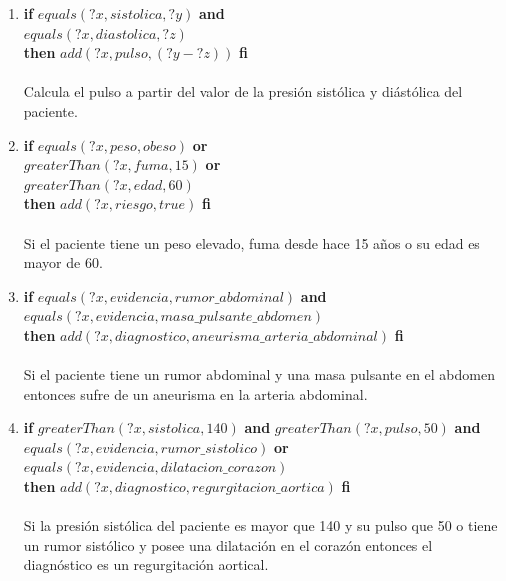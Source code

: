 \documentclass[10pt, a4paper,spanish]{article}
\begin{document}
			\begin{enumerate}[label={\textbf{R\theenumi:}}]

				\item
					\textbf{if} $equals(?x, sistolica, ?y)$ \textbf{and} \\
						\hspace*{0.5cm} $equals(?x, diastolica, ?z)$ \\
					\textbf{then} $add(?x, pulso, (?y - ?z) )$ \textbf{fi}
					\\ \\
					Calcula el pulso a partir del valor de la presión sistólica y diástólica del paciente.

				\item
					\textbf{if} $equals(?x, peso, obeso)$ \textbf{or} \\
						\hspace*{0.5cm} $greaterThan(?x, fuma, 15)$ \textbf{or} \\
						\hspace*{0.5cm} $greaterThan(?x, edad, 60)$ \\
					\textbf{then} $add(?x, riesgo, true)$ \textbf{fi}
					\\ \\
					Si el paciente tiene un peso elevado, fuma desde hace 15 años o su edad es mayor de 60.

				\item
					\textbf{if} $equals(?x, evidencia, rumor\_abdominal)$ \textbf{and} \\
						\hspace*{0.5cm} $equals(?x, evidencia, masa\_pulsante\_abdomen)$ \\
					\textbf{then} $add(?x, diagnostico, aneurisma\_arteria\_abdominal)$ \textbf{fi}
					\\ \\
					Si el paciente tiene un rumor abdominal y una masa pulsante en el abdomen entonces sufre de un aneurisma en la arteria abdominal.

				\item
					\textbf{if} $greaterThan(?x, sistolica, 140)$ \textbf{and} $greaterThan(?x, pulso, 50)$ \textbf{and} \\
						\hspace*{0.5cm} $equals(?x, evidencia, rumor\_sistolico)$  \textbf{or}\\
						\hspace*{0.5cm} $equals(?x, evidencia, dilatacion\_corazon)$ \\
					\textbf{then} $add(?x, diagnostico, regurgitacion\_aortica)$ \textbf{fi}
					\\ \\
					Si la presión sistólica del paciente es mayor que 140 y su pulso que 50 o tiene un rumor sistólico y posee una dilatación en el corazón entonces el diagnóstico es un regurgitación aortical.


\end{enumerate}
\end{document}
